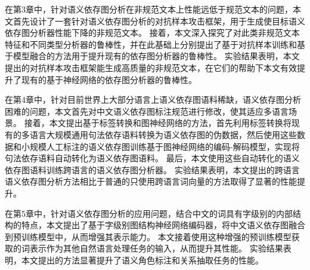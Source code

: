 在第3章中，针对语义依存图分析在非规范文本上性能远低于规范文本的问题，本文首先设计了一套针对语义依存图分析的对抗样本攻击框架，用于生成使目标语义依存图分析器性能下降的非规范文本。
接着，本文深入探究了对此类非规范文本特征和不同类型分析器的鲁棒性，并在此基础上分别提出了基于对抗样本训练和基于模型融合的方法用于提升现有的依存图分析器的鲁棒性。
实验结果表明，本文提出的对抗样本攻击框架能生成高质量的非规范文本，在它们的帮助下本文有效提升了现有的基于神经网络的依存图分析器的鲁棒性。

在第4章中，针对目前世界上大部分语言上语义依存图语料稀缺，语义依存图分析困难的问题，本文首先对中文语义依存图标注规范进行修改，使其适应多语言场景。
接着，本文提出基于标签转换和图神经网络的方法，首先利用标签转换将现有的多语言大规模通用句法依存语料转换为语义依存图的伪数据，然后使用这些数据和小规模人工标注的语义依存图训练基于图神经网络的编码-解码模型，实现将句法依存语料自动转化为语义依存图语料。
最后，本文使用这些自动转化的语义依存图语料训练跨语言的语义依存图分析器。
实验结果表明，本文提出的跨语言语义依存图分析方法相比于普通的只使用跨语言词向量的方法取得了显著的性能提升。

在第5章中，针对语义依存图分析的应用问题，结合中文的词具有字级别的内部结构的特点，本文提出了基于字级别图结构神经网络编码器，将中文语义依存图融合到预训练模型中，从而增强其表示能力。
本文接着使用这种增强的预训练模型获取的词表示作为其他自然语言处理任务的输入，从而提升其性能。
实验结果表明，本文提出的方法显著提升了语义角色标注和关系抽取任务的性能。


